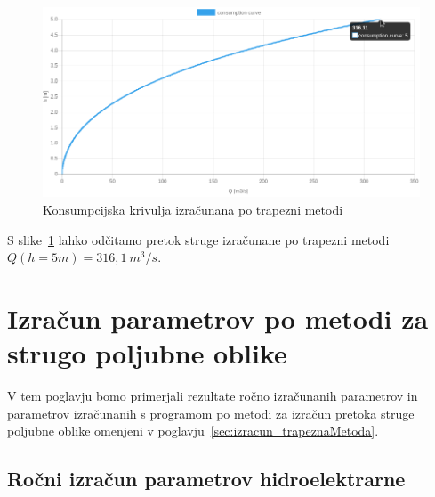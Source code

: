 \begin{figure}[H]
	\begin{centering}
		\includegraphics[width=\textwidth]{slike/izracuni/trapeznaMetoda_konsumpcijska.png}		
		\caption{Konsumpcijska krivulja izračunana po trapezni metodi}\label{fig:trapeznaMetoda_konsumpcijskaKrivulja}
	\end{centering}
\end{figure}



S slike~\ref{fig:trapeznaMetoda_konsumpcijskaKrivulja} lahko odčitamo pretok struge izračunane po trapezni metodi $Q(h=5m) = 316,1~m^3/s$. 


\section{Izračun parametrov po metodi za strugo poljubne oblike}\label{sec:izracun_numericnaMetoda}

V tem poglavju bomo primerjali rezultate ročno izračunanih parametrov in parametrov izračunanih s programom po metodi za izračun pretoka struge poljubne oblike omenjeni v poglavju~\ref{sec:izracun_trapeznaMetoda}.


\subsection{Ročni izračun parametrov hidroelektrarne}\label{sec:izracun_rocno_numericnaMetoda}

